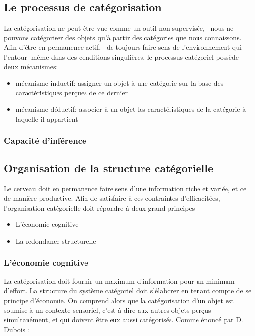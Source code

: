 \subsection{Le processus de catégorisation}

La catégorisation ne peut être vue comme un outil non-supervisée, \ie~nous ne pouvons catégoriser des objets qu'à partir des catégories que nous connaissons. Afin d'être en permanence actif, \ie~de toujours faire sens de l'environnement qui l'entour, même dans des conditions singulières, le processus catégoriel possède deux mécanismes:

\begin{itemize}
\item mécanisme inductif: assigner un objet à une catégorie sur la base des caractéristiques perçues de ce dernier
\item mécanisme déductif: associer à un objet les caractéristiques de la catégorie à laquelle il appartient
\end{itemize}

\subsubsection{Capacité d'inférence}

\subsection{Organisation de la structure catégorielle}

Le cerveau doit en permanence faire sens d'une information riche et variée, et ce de manière productive. Afin de satisfaire à ces contraintes d'efficacitées, l'organisation catégorielle doit répondre à deux grand principes \citep[p. 29]{rosch1978cognition}:

\begin{itemize}
\item L'économie cognitive
\item La redondance structurelle
\end{itemize}

\subsubsection{L'économie cognitive}

La catégorisation doit fournir un maximum d'information pour un minimum d'effort. La structure du système catégoriel doit s'élaborer en tenant compte de se principe d'économie. On comprend alors que la catégorisation d'un objet est soumise à un contexte sensoriel, c'est à dire aux autres objets perçus simultanément, et qui doivent être eux aussi catégorisés. Comme énoncé par D. Dubois \citep[p. 33]{dubois1991semantique}:


